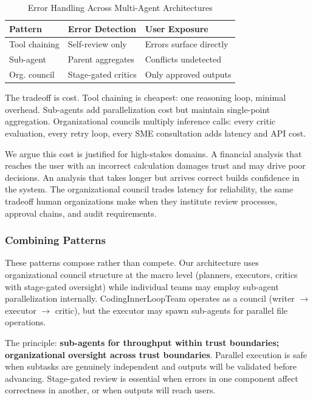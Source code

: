 \documentclass[sigconf]{acmart}
\begin{document}
\begin{table}[htbp]
\centering
\caption{Error Handling Across Multi-Agent Architectures}
\label{tab:error-handling}
\small
\begin{tabular}{@{}p{2.1cm}p{2.5cm}p{2.8cm}@{}}
\toprule
\textbf{Pattern} & \textbf{Error Detection} & \textbf{User Exposure} \\
\midrule
Tool chaining & Self-review only & Errors surface directly \\
Sub-agent & Parent aggregates & Conflicts undetected \\
Org. council & Stage-gated critics & Only approved outputs \\
\bottomrule
\end{tabular}
\end{table}

The tradeoff is cost. Tool chaining is cheapest: one reasoning loop, minimal overhead. Sub-agents add parallelization cost but maintain single-point aggregation. Organizational councils multiply inference calls: every critic evaluation, every retry loop, every SME consultation adds latency and API cost.

We argue this cost is justified for high-stakes domains. A financial analysis that reaches the user with an incorrect calculation damages trust and may drive poor decisions. An analysis that takes longer but arrives correct builds confidence in the system. The organizational council trades latency for reliability, the same tradeoff human organizations make when they institute review processes, approval chains, and audit requirements.

\subsubsection{Combining Patterns}

These patterns compose rather than compete. Our architecture uses organizational council structure at the macro level (planners, executors, critics with stage-gated oversight) while individual teams may employ sub-agent parallelization internally. CodingInnerLoopTeam operates as a council (writer $\rightarrow$ executor $\rightarrow$ critic), but the executor may spawn sub-agents for parallel file operations.

The principle: \textbf{sub-agents for throughput within trust boundaries; organizational oversight across trust boundaries}. Parallel execution is safe when subtasks are genuinely independent and outputs will be validated before advancing. Stage-gated review is essential when errors in one component affect correctness in another, or when outputs will reach users.
\end{document}
